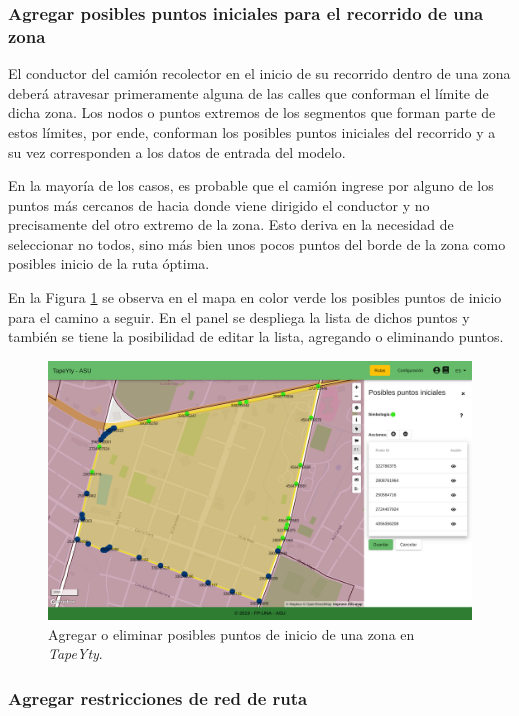 \subsubsection{Agregar posibles puntos iniciales para el recorrido de una zona}

El conductor del camión recolector en el inicio de su recorrido dentro de una zona deberá atravesar primeramente alguna de las calles que conforman el límite de dicha zona. Los nodos o puntos extremos de los segmentos que forman parte de estos límites, por ende, conforman los posibles puntos iniciales del recorrido y a su vez corresponden a los datos de entrada del modelo. 

En la mayoría de los casos, es probable que el camión ingrese por alguno de los puntos más cercanos de hacia donde viene dirigido el conductor y no precisamente del otro extremo de la zona. Esto deriva en la necesidad de seleccionar no todos, sino más bien unos pocos puntos del borde de la zona como posibles inicio de la ruta óptima.

En la Figura \ref{fig:puntosIniciales} se observa en el mapa en color verde los posibles puntos de inicio para el camino a seguir. En el panel se despliega la lista de dichos puntos y también se tiene la posibilidad de editar la lista, agregando o eliminando puntos.

\begin{figure}[H]
\centerline{\includegraphics[width=\textwidth]{puntosIniciales.png}}
\caption{Agregar o eliminar posibles puntos de inicio de una zona en \textit{TapeYty}.}
\label{fig:puntosIniciales}
\end{figure}

\subsubsection{Agregar restricciones de red de ruta}

